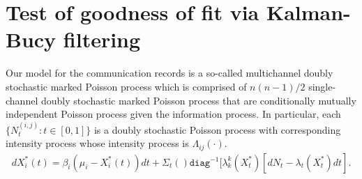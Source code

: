 \documentclass[12pt]{article}%
\begin{document}
\section{Test of goodness of fit via Kalman-Bucy filtering}
Our model for the communication records is a so-called multichannel doubly
stochastic marked Poisson process which is comprised of $n(n-1)/2$ single-channel doubly stochastic marked Poisson process that are conditionally mutually
independent Poisson process given the information process.  In particular,  
each $\{N_t^{(i,j)} : t \in [0,1]\}$ is a doubly stochastic Poisson process with
corresponding intensity process whose intensity process is $\Lambda_{ij}(\cdot)$.
\begin{eqnarray}
dX_i^*(t) = 
\beta_i (\mu_i - X_i^*(t)) dt  
+
\Sigma_{t} () \texttt{diag}^{-1}[\lambda_k^k(X_t^*) [dN_t - \lambda_t(X_t^*)dt].
\end{eqnarray}
\end{document}
